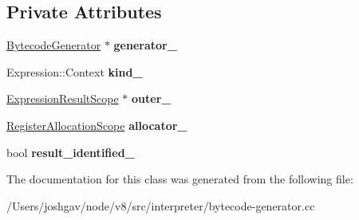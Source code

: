 \subsection*{Private Attributes}
\begin{DoxyCompactItemize}
\item 
\hyperlink{classv8_1_1internal_1_1interpreter_1_1_bytecode_generator}{Bytecode\+Generator} $\ast$ {\bfseries generator\+\_\+}\hypertarget{classv8_1_1internal_1_1interpreter_1_1_bytecode_generator_1_1_expression_result_scope_a549fad40cae5a6563510680f4b54215e}{}\label{classv8_1_1internal_1_1interpreter_1_1_bytecode_generator_1_1_expression_result_scope_a549fad40cae5a6563510680f4b54215e}

\item 
Expression\+::\+Context {\bfseries kind\+\_\+}\hypertarget{classv8_1_1internal_1_1interpreter_1_1_bytecode_generator_1_1_expression_result_scope_a2a0d0265ab0bacb969ddcd5ff2b3fad9}{}\label{classv8_1_1internal_1_1interpreter_1_1_bytecode_generator_1_1_expression_result_scope_a2a0d0265ab0bacb969ddcd5ff2b3fad9}

\item 
\hyperlink{classv8_1_1internal_1_1interpreter_1_1_bytecode_generator_1_1_expression_result_scope}{Expression\+Result\+Scope} $\ast$ {\bfseries outer\+\_\+}\hypertarget{classv8_1_1internal_1_1interpreter_1_1_bytecode_generator_1_1_expression_result_scope_af1f39c15b7ed6f4d450b511e613d06f9}{}\label{classv8_1_1internal_1_1interpreter_1_1_bytecode_generator_1_1_expression_result_scope_af1f39c15b7ed6f4d450b511e613d06f9}

\item 
\hyperlink{classv8_1_1internal_1_1interpreter_1_1_bytecode_generator_1_1_register_allocation_scope}{Register\+Allocation\+Scope} {\bfseries allocator\+\_\+}\hypertarget{classv8_1_1internal_1_1interpreter_1_1_bytecode_generator_1_1_expression_result_scope_a08e097c203fdb7ce5875a72a70b4e757}{}\label{classv8_1_1internal_1_1interpreter_1_1_bytecode_generator_1_1_expression_result_scope_a08e097c203fdb7ce5875a72a70b4e757}

\item 
bool {\bfseries result\+\_\+identified\+\_\+}\hypertarget{classv8_1_1internal_1_1interpreter_1_1_bytecode_generator_1_1_expression_result_scope_a1c7289e0782d27eba7dbd103dccb90b2}{}\label{classv8_1_1internal_1_1interpreter_1_1_bytecode_generator_1_1_expression_result_scope_a1c7289e0782d27eba7dbd103dccb90b2}

\end{DoxyCompactItemize}


The documentation for this class was generated from the following file\+:\begin{DoxyCompactItemize}
\item 
/\+Users/joshgav/node/v8/src/interpreter/bytecode-\/generator.\+cc\end{DoxyCompactItemize}
